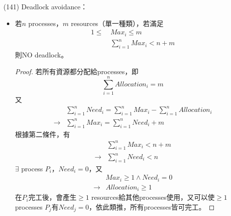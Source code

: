 \begin{theorem}{(141)} Deadlock avoidance：\begin{itemize}
        \item 若$n$ processes，$m$ resources（單一種類），若滿足\begin{equation} \label{eq:deadlock}
            \begin{aligned}
                1 \le \ & Max_i \le m \\
                & \sum_{i = 1}^{n} Max_i < n + m
            \end{aligned}
        \end{equation} 則NO deadlock。\\ \begin{proof}
            若所有資源都分配給processes，即\begin{equation}
                \sum_{i = 1}^{n} Allocation_i = m
            \end{equation} 又\begin{equation}
                \begin{aligned}
                    & \sum_{i = 1}^{n} Need_i = \sum_{i = 1}^{n} Max_i - \sum_{i = 1}^{n} Allocation_i \\
                    \rightarrow & \sum_{i = 1}^{n} Max_i = \sum_{i = 1}^{n} Need_i + m
                \end{aligned}
            \end{equation}
            根據第二條件，有\begin{equation}
                \begin{aligned}
                    & \sum_{i = 1}^{n} Max_i < n + m \\
                    \rightarrow & \sum_{i = 1}^{n} Need_i < n
                \end{aligned}
            \end{equation}$\exists$ process $P_i$，$Need_i = 0$，又\begin{equation}
                \begin{aligned}
                    & Max_i \ge 1 \land Need_i = 0 \\
                    \rightarrow & Allocation_i \ge 1
                \end{aligned}
            \end{equation}在$P_i$完工後，會產生$\ge 1$ resources給其他processes使用，又可以使$\ge 1$ processes $P_j$有$Need_j = 0$，依此類推，所有processes皆可完工。
        \end{proof}
    \end{itemize}
\end{theorem}
